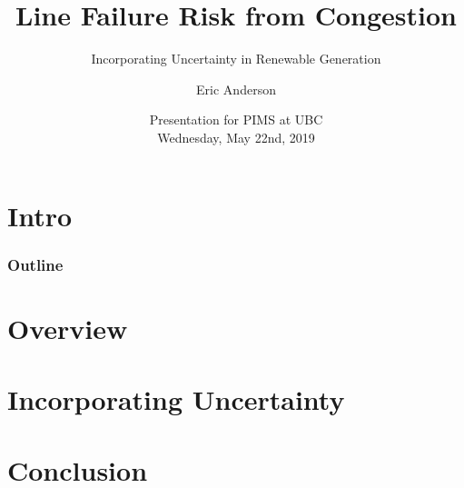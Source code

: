 
\newcommand{\mypathbase}{/home/eric/work/present/ases-present}
\newcommand{\mypathdata}{\mypathbase/data}
\newcommand{\mypathjcc}{\mypathbase/jcc}
\newcommand{\mypathjccdata}{\mypathbase/jcc/data}
\newcommand{\mypathdfo}{\mypathbase/dfo}
\newcommand{\mypathimg}{\mypathbase/img}
\newcommand{\bc}[1]{}

\title[Reliability and Renewable Generation]{Line Failure Risk from Congestion}
\subtitle{Incorporating Uncertainty in Renewable Generation}
\author{Eric Anderson}

\date{Presentation for PIMS at UBC \\
  Wednesday, May 22nd, 2019}


\frame{\titlepage}
\section{Intro}


\subsubsection{Outline}
\frame{\tableofcontents[subsubsectionstyle=hide]}


\section{Overview}


\section{Incorporating Uncertainty}
\frame{\tableofcontents[currentsection,subsubsectionstyle=hide]}


\section{Conclusion}





